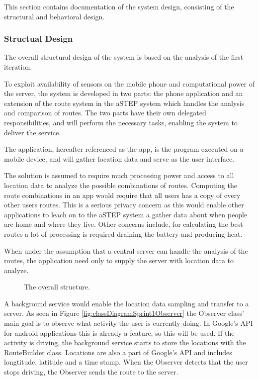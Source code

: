 This section contains documentation of the system design, consisting of the structural and behavioral design.

\subsubsection{Structual Design}
The overall structural design of the system is based on the analysis of the first iteration.

To exploit availability of sensors on the mobile phone and computational power of the server, the system is developed in two parts: the phone application and an extension of the route system in the aSTEP system which handles the analysis and comparison of routes.
The two parts have their own delegated responsibilities, and will perform the necessary tasks, enabling the system to deliver the service.

The application, hereafter referenced as the app, is the program executed on a mobile device, and will gather location data and serve as the user interface. 

The solution is assumed to require much processing power and access to all location data to analyze the possible combinations of routes.
Computing the route combinations in an app would require that all users has a copy of every other users routes.
This is a serious privacy concern as this would enable other applications to leach on to the aSTEP system a gather data about when people are home and where they live.
Other concerns include, for calculating the best routes a lot of processing is required draining the battery and producing heat.

When under the assumption that a central server can handle the analysis of the routes, the application need only to supply the server with location data to analyze.

\begin{figure}[h]
	\centering
	
	\caption{The overall structure.}
	\label{fig:packageDiagramSprint1}
\end{figure}

A background service would enable the location data sampling and transfer to a server.
As seen in Figure \ref{fig:classDiagramSprint1Observer} the Observer class' main goal is to observe what activity the user is currently doing.
In Google's API for android applications this is already a feature, so this will be used.
If the activity is driving, the background service starts to store the locations with the RouteBuilder class.
Locations are also a part of Google's API and includes longtitude, latitude and a time stamp.
When the Observer detects that the user stops driving, the Observer sends the route to the server.

